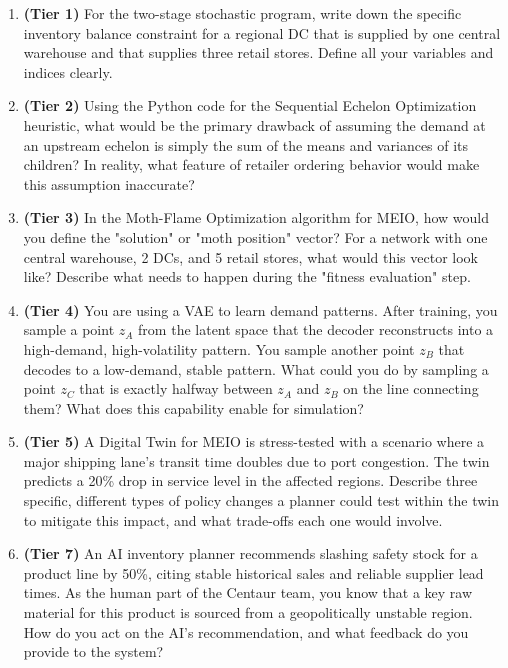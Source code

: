 \documentclass{article}
\begin{document}
\begin{enumerate}
    \item \textbf{(Tier 1)} For the two-stage stochastic program, write down the specific inventory balance constraint for a regional DC that is supplied by one central warehouse and that supplies three retail stores. Define all your variables and indices clearly.

    \item \textbf{(Tier 2)} Using the Python code for the Sequential Echelon Optimization heuristic, what would be the primary drawback of assuming the demand at an upstream echelon is simply the sum of the means and variances of its children? In reality, what feature of retailer ordering behavior would make this assumption inaccurate?

    \item \textbf{(Tier 3)} In the Moth-Flame Optimization algorithm for MEIO, how would you define the "solution" or "moth position" vector? For a network with one central warehouse, 2 DCs, and 5 retail stores, what would this vector look like? Describe what needs to happen during the "fitness evaluation" step.
    
    \item \textbf{(Tier 4)} You are using a VAE to learn demand patterns. After training, you sample a point $z_A$ from the latent space that the decoder reconstructs into a high-demand, high-volatility pattern. You sample another point $z_B$ that decodes to a low-demand, stable pattern. What could you do by sampling a point $z_C$ that is exactly halfway between $z_A$ and $z_B$ on the line connecting them? What does this capability enable for simulation?

    \item \textbf{(Tier 5)} A Digital Twin for MEIO is stress-tested with a scenario where a major shipping lane's transit time doubles due to port congestion. The twin predicts a 20\% drop in service level in the affected regions. Describe three specific, different types of policy changes a planner could test within the twin to mitigate this impact, and what trade-offs each one would involve.

    \item \textbf{(Tier 7)} An AI inventory planner recommends slashing safety stock for a product line by 50\%, citing stable historical sales and reliable supplier lead times. As the human part of the Centaur team, you know that a key raw material for this product is sourced from a geopolitically unstable region. How do you act on the AI's recommendation, and what feedback do you provide to the system?


\end{enumerate}
\end{document}
